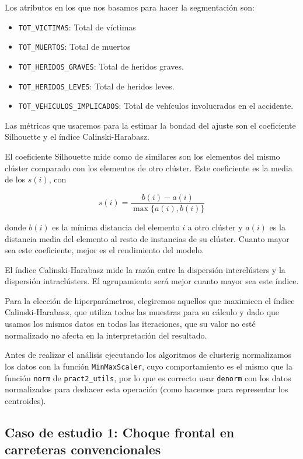 \documentclass[a4]{article}
\begin{document}
Los atributos en los que nos basamos para hacer la segmentación son:

\begin{itemize}
\item \texttt{TOT\_VICTIMAS}: Total de víctimas
\item \texttt{TOT\_MUERTOS}: Total de muertos
\item \texttt{TOT\_HERIDOS\_GRAVES}: Total de heridos graves.
\item \texttt{TOT\_HERIDOS\_LEVES}: Total de heridos leves.
\item \texttt{TOT\_VEHICULOS\_IMPLICADOS}: Total de vehículos involucrados en el accidente.
\end{itemize}

Las métricas que usaremos para la estimar la bondad del ajuste son el coeficiente Silhouette y el índice Calinski-Harabasz.

El coeficiente Silhouette mide como de similares son los elementos del mismo clúster comparado con los elementos de otro clúster. Este coeficiente es la media de los $s(i)$, con

$$s(i) = \frac{b(i)-a(i)}{\max\{a(i), b(i)\}}$$

donde $b(i)$ es la mínima distancia del elemento $i$ a otro clúster y $a(i)$ es la distancia media del elemento al resto de instancias de su clúster. Cuanto mayor sea este coeficiente, mejor es el rendimiento del modelo.

El índice Calinski-Harabasz mide la razón entre la dispersión interclústers y la dispersión intraclústers. El agrupamiento será mejor cuanto mayor sea este índice.

Para la elección de hiperparámetros, elegiremos aquellos que maximicen el índice Calinski-Harabasz, que utiliza todas las muestras para su cálculo y dado que usamos los mismos datos en todas las iteraciones, que su valor no esté normalizado no afecta en la interpretación del resultado.

Antes de realizar el análisis ejecutando los algoritmos de clusterig normalizamos los datos con la función \texttt{MinMaxScaler}, cuyo comportamiento es el mismo que la función \texttt{norm} de \texttt{pract2\_utils}, por lo que es correcto usar \texttt{denorm} con los datos normalizados para deshacer esta operación (como hacemos para representar los centroides).

\newpage
\subsection{Caso de estudio 1: Choque frontal en carreteras convencionales}
\end{document}
